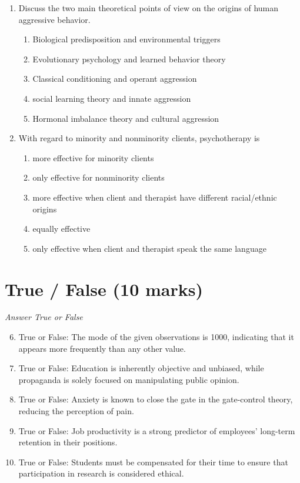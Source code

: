 \documentclass[12pt]{article}
\begin{document}
\begin{enumerate}[label=\arabic*.]
\begin{enumerate}[label=(\alph*)]
    \item Experimental phase, social use phase, intensive use phase, compulsive use phase
    \item Initial phase, middle phase, crucial phase, termination phase
\end{enumerate}
\item Discuss the two main theoretical points of view on the origins of human aggressive behavior.
\begin{enumerate}[label=(\alph*)]
    \item Biological predisposition and environmental triggers
    \item Evolutionary psychology and learned behavior theory
    \item Classical conditioning and operant aggression
    \item social learning theory and innate aggression
    \item Hormonal imbalance theory and cultural aggression
\end{enumerate}
\item With regard to minority and nonminority clients, psychotherapy is
\begin{enumerate}[label=(\alph*)]
    \item more effective for minority clients
    \item only effective for nonminority clients
    \item more effective when client and therapist have different racial/ethnic origins
    \item equally effective
    \item only effective when client and therapist speak the same language
\end{enumerate}
\end{enumerate}

\section*{True / False (10 marks)}
\textit{Answer True or False}
\begin{enumerate}[label=\arabic*.]
\setcounter{enumi}{5}
\item True or False: The mode of the given observations is 1000, indicating that it appears more frequently than any other value.
\item True or False: Education is inherently objective and unbiased, while propaganda is solely focused on manipulating public opinion.
\item True or False: Anxiety is known to close the gate in the gate-control theory, reducing the perception of pain.
\item True or False: Job productivity is a strong predictor of employees' long-term retention in their positions.
\item True or False: Students must be compensated for their time to ensure that participation in research is considered ethical.
\end{enumerate}
\end{document}
